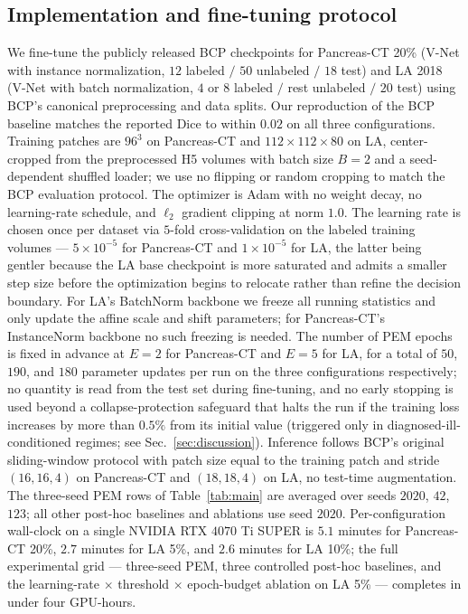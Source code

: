 \subsection{Implementation and fine-tuning protocol}
\label{sec:method:impl}

We fine-tune the publicly released BCP checkpoints for Pancreas-CT 20\% (V-Net with instance normalization, $12$ labeled $/$ $50$ unlabeled $/$ $18$ test) and LA 2018 (V-Net with batch normalization, $4$ or $8$ labeled $/$ rest unlabeled $/$ $20$ test) using BCP's canonical preprocessing and data splits. Our reproduction of the BCP baseline matches the reported Dice to within $0.02$ on all three configurations. Training patches are $96^3$ on Pancreas-CT and $112\!\times\!112\!\times\!80$ on LA, center-cropped from the preprocessed H5 volumes with batch size $B\!=\!2$ and a seed-dependent shuffled loader; we use no flipping or random cropping to match the BCP evaluation protocol. The optimizer is Adam with no weight decay, no learning-rate schedule, and $\ell_2$ gradient clipping at norm $1.0$. The learning rate is chosen once per dataset via $5$-fold cross-validation on the labeled training volumes --- $5\!\times\!10^{-5}$ for Pancreas-CT and $1\!\times\!10^{-5}$ for LA, the latter being gentler because the LA base checkpoint is more saturated and admits a smaller step size before the optimization begins to relocate rather than refine the decision boundary. For LA's BatchNorm backbone we freeze all running statistics and only update the affine scale and shift parameters; for Pancreas-CT's InstanceNorm backbone no such freezing is needed. The number of PEM epochs is fixed in advance at $E\!=\!2$ for Pancreas-CT and $E\!=\!5$ for LA, for a total of $50$, $190$, and $180$ parameter updates per run on the three configurations respectively; no quantity is read from the test set during fine-tuning, and no early stopping is used beyond a collapse-protection safeguard that halts the run if the training loss increases by more than $0.5\%$ from its initial value (triggered only in diagnosed-ill-conditioned regimes; see Sec.~\ref{sec:discussion}). Inference follows BCP's original sliding-window protocol with patch size equal to the training patch and stride $(16, 16, 4)$ on Pancreas-CT and $(18, 18, 4)$ on LA, no test-time augmentation. The three-seed PEM rows of Table~\ref{tab:main} are averaged over seeds $2020$, $42$, $123$; all other post-hoc baselines and ablations use seed $2020$. Per-configuration wall-clock on a single NVIDIA RTX $4070$ Ti SUPER is $5.1$ minutes for Pancreas-CT 20\%, $2.7$ minutes for LA 5\%, and $2.6$ minutes for LA 10\%; the full experimental grid --- three-seed PEM, three controlled post-hoc baselines, and the learning-rate $\times$ threshold $\times$ epoch-budget ablation on LA 5\% --- completes in under four GPU-hours.

